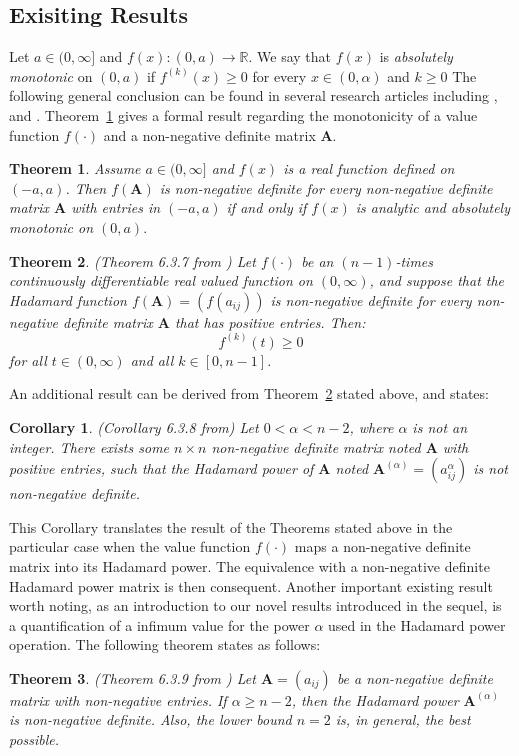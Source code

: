 \documentclass[conference,letterpaper]{IEEEtran}
\numberwithin{equation}{section}
\newcommand{\lbl}{\label}
\newtheorem{theorem}{{\sc Theorem}}[section]
\newtheorem{coro}{{\sc Corollary}}[section]
\begin{document}
\subsection{Exisiting Results}\lbl{known_results}

 Let $a \in (0, \infty]$ and $f(x): (0, a)\to \mathbb{R}$. 
 We say that $f(x)$ is {\it absolutely monotonic} on  $(0, a)$ if $f^{(k)}(x)\geq 0$ for every $x\in (0, \alpha)$ and $k\geq0$ 
 The following general conclusion can be found in several research articles including \cite{schoenberg1988positive},  \cite{vasudeva1979positive} and \cite{hiai2009monotonicity}.
Theorem~\ref{oldth1} gives a formal result regarding the monotonicity of a value function $f(\cdot)$ and a non-negative definite matrix $\mathbf{A}$.
\begin{theorem} \label{oldth1}
Assume $a \in (0, \infty]$ and $f(x)$ is a real function defined on $(-a, a)$.  
Then $f(\mathbf{A})$ is non-negative definite for every non-negative definite matrix  $\mathbf{A}$ with  entries in $(-a, a)$ if and only if $f(x)$ is analytic and absolutely monotonic on $(0, a).$
\end{theorem}


\begin{theorem}\label{oldth2} (Theorem 6.3.7 from \cite{horn_johnson_1991})
	Let $f(\cdot)$ be an $(n-1)$-times continuously differentiable real valued function on $(0,\infty)$, and suppose that the Hadamard function $f(\mathbf{A})=(f(a_{ij}))$ is non-negative definite for every non-negative definite matrix $\mathbf{A}$ that has positive entries. Then:
$$f^{(k)}(t)\geq 0$$
 for all $t\in(0,\infty)$ and all $k \in [0,n-1]$.
\end{theorem}
An additional result can be derived from Theorem~\ref{oldth2} stated above, and states:
\begin{coro}(Corollary 6.3.8 from\cite{horn_johnson_1991})
	Let $0<\alpha<n-2$, where $\alpha$ is not an integer. 
	There exists some $n\times n$ non-negative definite matrix noted $\mathbf{A}$ with positive entries, such that the Hadamard power of  $\mathbf{A}$ noted $\mathbf{A}^{(\alpha)}=(a_{ij}^\alpha)$ is not non-negative definite.
\end{coro}
This Corollary translates the result of the Theorems stated above in the particular case when the value function $f(\cdot)$ maps a non-negative definite matrix into its Hadamard power. 
The equivalence with a non-negative definite Hadamard power matrix is then consequent.
Another important existing result worth noting, as an introduction to our novel results introduced in the sequel, is a quantification of a infimum value for the power $\alpha$ used in the Hadamard power operation. The following theorem states as follows:
\begin{theorem} (Theorem 6.3.9 from \cite{horn_johnson_1991})
	Let $\mathbf{A}=(a_{ij})$ be a non-negative definite matrix with non-negative entries. If $\alpha \geq n-2$, then the Hadamard power $\mathbf{A}^{(\alpha)}$ is non-negative definite. 
	Also, the lower bound $n=2$ is, in general, the best possible.
\end{theorem}
\end{document}

